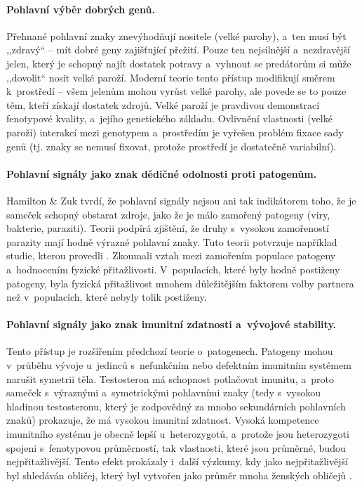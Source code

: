 \documentclass[a4paper, 12pt, notitlepage, oneside, numbers=noenddot]{report}
\begin{document}
\paragraph{Pohlavní výběr dobrých genů.}
Přehnané pohlavní znaky znevýhodňují nositele (velké parohy), a~ten
musí být ,,zdravý`` -- mít dobré geny zajišťující přežití.  Pouze ten
nejsilnější a~nezdravější jelen, který je schopný najít dostatek
potravy a~vyhnout se predátorům si může ,,dovolit`` nosit velké
paroží.  Moderní teorie tento přístup modifikují směrem k~prostředí --
všem jelenům mohou vyrůst velké parohy, ale povede se to pouze těm,
kteří získají dostatek zdrojů.  Velké paroží je pravdivou demonstrací
fenotypové kvality, a~jejího genetického základu. Ovlivnění vlastnosti
(velké paroží) interakcí mezi genotypem a~prostředím je vyřešen
problém fixace sady genů (tj. znaky se nemusí fixovat, protože
prostředí je dostatečně variabilní).

\paragraph{Pohlavní signály jako znak dědičné odolnosti proti
  patogenům.}
Hamilton \& Zuk tvrdí, že pohlavní signály nejsou ani tak indikátorem
toho, že je sameček schopný obstarat zdroje, jako že je málo zamořený
patogeny (viry, bakterie, paraziti). Teorii podpírá zjištění, že druhy
s~vysokou zamořeností parazity mají hodně výrazné pohlavní znaky.
Tuto teorii potvrzuje například studie, kterou provedli
\citet{GangestadBuss1993}.  Zkoumali vztah mezi zamořením populace
patogeny a~hodnocením fyzické přitažlivosti.  V~populacích, které byly
hodně postiženy patogeny, byla fyzická přitažlivost mnohem
důležitějším faktorem volby partnera než v~populacích, které nebyly
tolik postiženy.

\paragraph{Pohlavní signály jako znak imunitní zdatnosti a~vývojové
  stability.}
Tento přístup je rozšířením předchozí teorie o~patogenech. Patogeny
mohou v~průběhu vývoje u~jedinců s~nefunkčním nebo defektním imunitním
systémem narušit symetrii těla. Testosteron má schopnost potlačovat
imunitu, a~proto sameček s~výraznými a~symetrickými pohlavními znaky
(tedy s~vysokou hladinou testosteronu, který je zodpovědný za mnoho
sekundárních pohlavních znaků) prokazuje, že má vysokou imunitní
zdatnost.  Vysoká kompetence imunitního systému je obecně lepší
u~heterozygotů, a~protože jsou heterozygoti spojeni s~fenotypovou
průměrností, tak vlastnosti, které jsou průměrné, budou
nejpřitažlivější.  Tento efekt prokázaly i~další výzkumy, kdy jako
nejpřitažlivější byl shledáván obličej, který byl vytvořen jako průměr
mnoha ženských obličejů \citep{Ridley2007}.
\end{document}
